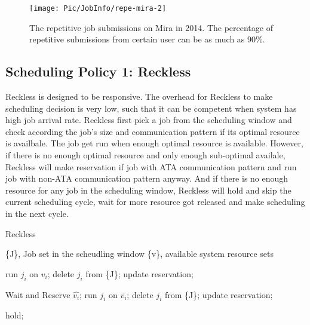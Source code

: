 \documentclass[conference]{IEEEtran}
\begin{document}
\begin{figure}[h!] 
  \centering
  \texttt{[image: Pic/JobInfo/repe-mira-2]}
   \caption{ The repetitive job submissions on Mira in 2014. The percentage of repetitive submissions from certain user can be as much as 90\%. }
   \label{fig: repetitiveness of Mira}
\end{figure}



\subsection{Scheduling Policy 1: Reckless}
\label{sec:reckless}

Reckless is designed to be responsive. The overhead for Reckless to make scheduling decision is very low, such that it can be competent when system has high job arrival rate. Reckless first pick a job from the scheduling window and check according the job's size and communication pattern if its optimal resource is availbale. The job get run when enough optimal resource is available. However, if there is no enough optimal resource and only enough sub-optimal availale, Reckless will make reservation if job with ATA communication pattern and run job with non-ATA communication pattern anyway. And if there is no enough resource for any job in the scheduling window, Reckless will hold and skip the current scheduling cycle, wait for more resource got released and make scheduling in the next cycle.

\begin{algorithm}
  \label{alg:scheudling1}
  \caption{Reckless}
  \begin{algorithmic}
    \State \{J\}, Job set in the scheudling window
    \State \{v\}, available system resource sets
        
            \State run $j_i$ on $v_i$;
            \State delete $j_i$ from \{J\};
            \State update reservation;
        \EndIf
        
                \State Wait and Reserve $\hat{v_i}$;
            \EndIf
                \State run $j_i$ on $\bar{v_i}$;
                \State delete $j_i$ from \{J\};
                \State update reservation;
            \EndIf
        \EndIf
        
            \State hold;
        \EndIf
        
    \EndWhile
  \end{algorithmic}
\end{algorithm}
\end{document}
